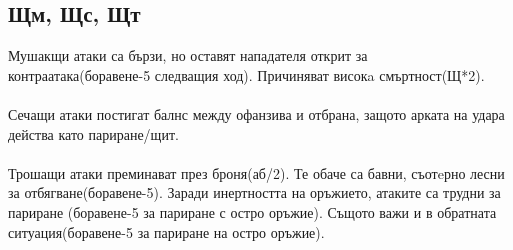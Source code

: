 

\subsection{Щм, Щс, Щт}
Мушакщи атаки са бързи, но оставят нападателя открит за контраатака(боравене-5 следващия ход).
Причиняват високa смъртност(Щ*2).
\\
\\
Сечащи атаки постигат балнс между офанзива и отбрана, защото арката на удара действа като париране/щит.
\\
\\
Трошащи атаки преминават през броня(аб/2).
Те обаче са бавни, съотeрно лесни за отбягване(боравене-5).
Заради инертността на оръжието, атаките са трудни за париране (боравене-5 за париране с остро оръжие).
Същото важи и в обратната ситуация(боравене-5 за париране на остро оръжие).


